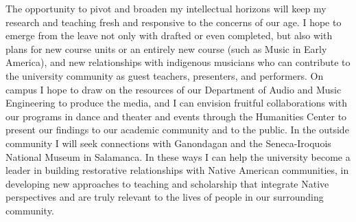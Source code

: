 \documentclass[12pt]{article}
\begin{document}
The opportunity to pivot and broaden my intellectual horizons will keep my
research and teaching fresh and responsive to the concerns of our age. 
I hope to emerge from the leave not only with  drafted or even completed, but also with plans for new course units or
an entirely new course (such as Music in Early America), and new relationships
with indigenous musicians who can contribute to the university community as
guest teachers, presenters, and performers.
On campus I hope to draw on the resources of our Department of Audio and Music
Engineering to produce the media, and I can envision fruitful collaborations
with our programs in dance and theater and events through the Humanities
Center to present our findings to our academic community and to the public.
In the outside community I will seek connections with Ganondagan and the
Seneca-Iroquois National Museum in Salamanca.
In these ways I can help the university become a leader in building restorative
relationships with Native American communities, in developing new approaches
to teaching and scholarship that integrate Native perspectives and are truly
relevant to the lives of people in our surrounding community.
\end{document}
